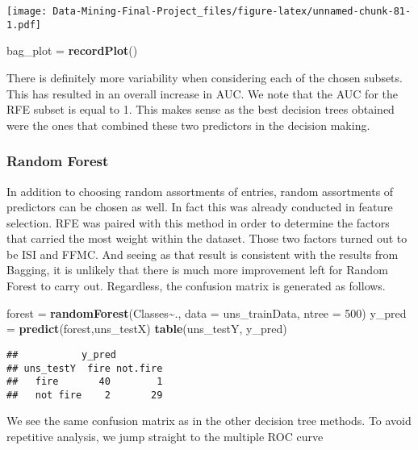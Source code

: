 \documentclass[
]{article}
\newenvironment{Shaded}{\begin{snugshade}}{\end{snugshade}}
\newcommand{\AttributeTok}[1]{\textcolor[rgb]{0.13,0.29,0.53}{#1}}
\newcommand{\DecValTok}[1]{\textcolor[rgb]{0.00,0.00,0.81}{#1}}
\newcommand{\FunctionTok}[1]{\textcolor[rgb]{0.13,0.29,0.53}{\textbf{#1}}}
\newcommand{\NormalTok}[1]{#1}
\newcommand{\OtherTok}[1]{\textcolor[rgb]{0.56,0.35,0.01}{#1}}
\newcommand{\SpecialCharTok}[1]{\textcolor[rgb]{0.81,0.36,0.00}{\textbf{#1}}}
\begin{document}
\texttt{[image: Data-Mining-Final-Project\_files/figure-latex/unnamed-chunk-81-1.pdf]}

\begin{Shaded}
\begin{Highlighting}[]
\NormalTok{bag\_plot }\OtherTok{=} \FunctionTok{recordPlot}\NormalTok{()}
\end{Highlighting}
\end{Shaded}

There is definitely more variability when considering each of the chosen
subsets. This has resulted in an overall increase in AUC. We note that
the AUC for the RFE subset is equal to 1. This makes sense as the best
decision trees obtained were the ones that combined these two predictors
in the decision making.

\subsubsection{Random Forest}\label{random-forest}

In addition to choosing random assortments of entries, random
assortments of predictors can be chosen as well. In fact this was
already conducted in feature selection. RFE was paired with this method
in order to determine the factors that carried the most weight within
the dataset. Those two factors turned out to be ISI and FFMC. And seeing
as that result is consistent with the results from Bagging, it is
unlikely that there is much more improvement left for Random Forest to
carry out. Regardless, the confusion matrix is generated as follows.

\begin{Shaded}
\begin{Highlighting}[]
\NormalTok{forest }\OtherTok{=} \FunctionTok{randomForest}\NormalTok{(Classes}\SpecialCharTok{\textasciitilde{}}\NormalTok{., }\AttributeTok{data =}\NormalTok{ uns\_trainData, }\AttributeTok{ntree =} \DecValTok{500}\NormalTok{) }
\NormalTok{y\_pred }\OtherTok{=} \FunctionTok{predict}\NormalTok{(forest,uns\_testX) }
\FunctionTok{table}\NormalTok{(uns\_testY, y\_pred)}
\end{Highlighting}
\end{Shaded}

\begin{verbatim}
##           y_pred
## uns_testY  fire not.fire
##   fire       40        1
##   not fire    2       29
\end{verbatim}

We see the same confusion matrix as in the other decision tree methods.
To avoid repetitive analysis, we jump straight to the multiple ROC curve
\end{document}
